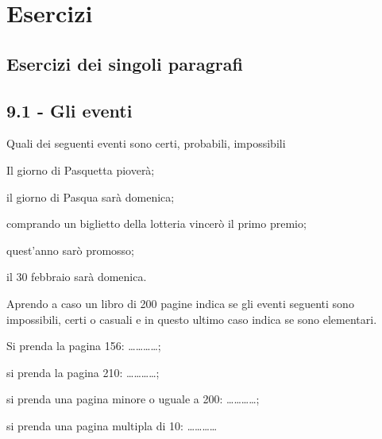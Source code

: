 \section{Esercizi}
\subsection{Esercizi dei singoli paragrafi}
\subsection*{9.1 - Gli eventi}

\begin{esercizio}
 \label{ese:9.1}
Quali dei seguenti eventi sono certi, probabili, impossibili
\begin{enumeratea}
\item Il giorno di Pasquetta pioverà;
\item il giorno di Pasqua sarà domenica;
\item comprando un biglietto della lotteria vincerò il primo premio;
\item quest'anno sarò promosso;
\item il 30 febbraio sarà domenica.
\end{enumeratea}
\end{esercizio}

\begin{esercizio}
 \label{ese:9.2}
Aprendo a caso un libro di 200 pagine indica se gli eventi seguenti sono impossibili, certi o casuali e in questo ultimo caso indica se sono elementari.
\begin{enumeratea}
\item Si prenda la pagina 156: \ldots\ldots\ldots\ldots;
\item si prenda la pagina 210: \ldots\ldots\ldots\ldots;
\item si prenda una pagina minore o uguale a 200: \ldots\ldots\ldots\ldots;
\item si prenda una pagina multipla di 10: \ldots\ldots\ldots\ldots
\end{enumeratea}
\end{esercizio}

